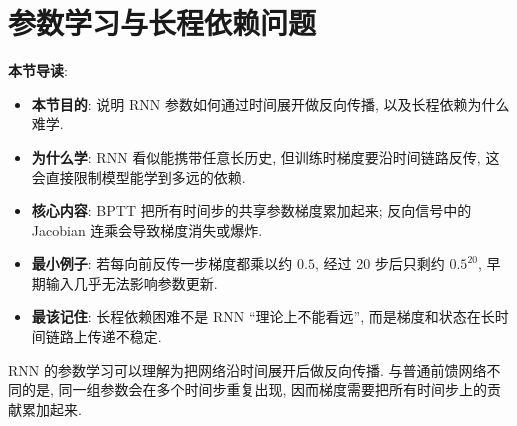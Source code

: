 \documentclass{../nndlcourse}
\begin{document}
\section{参数学习与长程依赖问题}

\textbf{本节导读}:
\begin{itemize}
  \item \textbf{本节目的}: 说明 RNN 参数如何通过时间展开做反向传播, 以及长程依赖为什么难学.
  \item \textbf{为什么学}: RNN 看似能携带任意长历史, 但训练时梯度要沿时间链路反传, 这会直接限制模型能学到多远的依赖.
  \item \textbf{核心内容}: BPTT 把所有时间步的共享参数梯度累加起来; 反向信号中的 Jacobian 连乘会导致梯度消失或爆炸.
  \item \textbf{最小例子}: 若每向前反传一步梯度都乘以约 $0.5$, 经过 20 步后只剩约 $0.5^{20}$, 早期输入几乎无法影响参数更新.
  \item \textbf{最该记住}: 长程依赖困难不是 RNN “理论上不能看远”, 而是梯度和状态在长时间链路上传递不稳定.
\end{itemize}

RNN 的参数学习可以理解为把网络沿时间展开后做反向传播. 与普通前馈网络不同的是, 同一组参数会在多个时间步重复出现, 因而梯度需要把所有时间步上的贡献累加起来.
\end{document}
